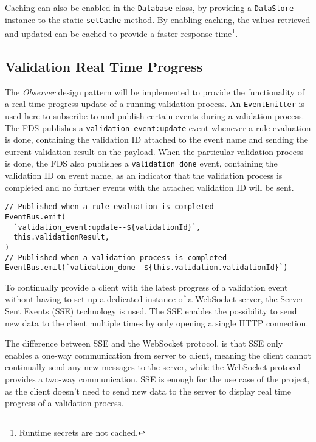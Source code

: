     Caching can also be enabled in the \verb;Database; class, by providing a \verb;DataStore; instance to the static \verb;setCache; method. By enabling caching, the values retrieved and updated can be cached to provide a faster response time\footnote{Runtime secrets are not cached.}. 

  \subsection{Validation Real Time Progress}
    \label{impl_sse}
  
    The \emph{Observer} \autocite[pp. 293-303]{gamma-1995} design pattern will be implemented to provide the functionality of a real time progress update of a running validation process. An \verb;EventEmitter; is used here to subscribe to and publish certain events during a validation process. The FDS publishes a \verb;validation_event:update; event whenever a rule evaluation is done, containing the validation ID attached to the event name and sending the current validation result on the payload. When the particular validation process is done, the FDS also publishes a \verb;validation_done; event, containing the validation ID on event name, as an indicator that the validation process is completed and no further events with the attached validation ID will be sent. 

    \begin{lstlisting}[style=es6, caption={Publishing events on certain validation events using the EventEmitter (TypeScript)}]
// Published when a rule evaluation is completed
EventBus.emit(
  `validation_event:update--${validationId}`,
  this.validationResult,
)
// Published when a validation process is completed
EventBus.emit(`validation_done--${this.validation.validationId}`)
\end{lstlisting}
    
    To continually provide a client with the latest progress of a validation event without having to set up a dedicated instance of a WebSocket server, the Server-Sent Events (SSE)\autocite{rfc8895} technology is used. The SSE enables the possibility to send new data to the client multiple times by only opening a single HTTP connection. 
    
    The difference between SSE and the WebSocket protocol, is that SSE only enables a one-way communication from server to client, meaning the client cannot continually send any new messages to the server, while the WebSocket protocol provides a two-way communication. SSE is enough for the use case of the project, as the client doesn't need to send new data to the server to display real time progress of a validation process.

